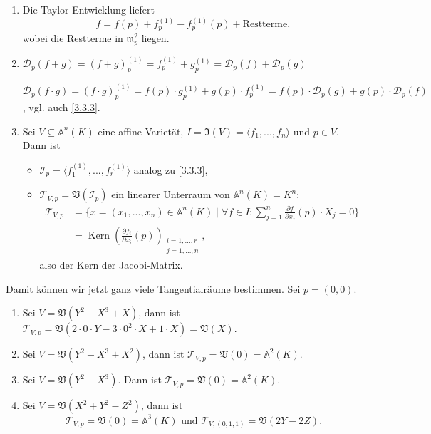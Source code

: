 \documentclass[a4paper,12pt]{scrbook}
\theoremstyle{keinenummern} %
\theoremstyle{mitnummern}
\theoremstyle{unserbeweis}
\def\A{\mathbb{A}}
\def\V{\mathfrak{V}}
\def\I{\mathfrak{I}}
\def\II{\mathcal{I}}
\newcommand{\DD}{\mathcal{D}} %
\def\T{\mathcal{T}}
\def\m{\mathfrak{m}}
\newcommand{\Kern}{\operatorname{Kern}}
\let\olddotsc\dotsc %
\renewcommand{\dotsc}{\ensuremath{\!...}}
\begin{document}
\begin{bem}\label{3.3.4}
\begin{enumerate}
\item{} Die Taylor-Entwicklung liefert
\[f=f(p)+f_{p}^{(1)}-f_{p}^{(1)}(p)+\text{Restterme},\]
wobei die Restterme in $\m_{p}^{2}$ liegen.
\item{} $\DD_{p}(f+g)=(f+g)_{p}^{(1)}=f_{p}^{(1)}+g_{p}^{(1)}=\DD_{p}(f)+\DD_{p}(g)$

$\DD_{p}(f\cdot g)=(f\cdot g)_{p}^{(1)}=f(p)\cdot g_{p}^{(1)}+g(p)\cdot f_{p}^{(1)}=f(p)\cdot \DD_{p}(g)+g(p)\cdot\DD_{p}(f)$, vgl. auch \cref{3.3.3}.
\item{} Sei $V\subseteq\A^{n}(K)$ eine affine Varietät, $I=\I(V)=\langle f_{1},\dotsc,f_{n}\rangle$ und $p\in V$. Dann ist
\begin{itemize}
\item $\II_{p}=\langle f_{1}^{(1)},\dotsc,f_{r}^{(1)}\rangle$ analog zu \cref{3.3.3},
\item $\T_{V,p}=\V(\II_{p})$ ein linearer Unterraum von $\A^{n}(K)=K^{n}$:
\begin{align*}\T_{V,p}&=\{x=(x_{1},\dotsc,x_{n})\in\A^{n}(K)\mid \forall f\in I:\sum_{j=1}^{n}\frac{\partial f}{\partial x_{j}}(p)\cdot X_{j}=0\}\\
&=\Kern\left(\frac{\partial f_{i}}{\partial x_{i}}(p)\right)_{\substack{i=1,\olddotsc,r\\ j=1,\olddotsc,n}},\end{align*}
also der Kern der Jacobi-Matrix.
\end{itemize}
\end{enumerate}\end{bem}

\begin{bsp}\label{3.3.5}
Damit können wir jetzt ganz viele Tangentialräume bestimmen. Sei $p=(0,0)$.
\begin{enumerate}
\item Sei $V=\V(Y^{2}-X^{3}+X)$, dann ist $\T_{V,p}=\V(2\cdot 0\cdot Y - 3\cdot 0^{2}\cdot X + 1\cdot X)=\V(X)$.
\item Sei $V=\V(Y^{2}-X^{3}+X^{2})$, dann ist $\T_{V,p}=\V(0)=\A^{2}(K)$.
\item Sei $V=\V(Y^{2}-X^{3})$. Dann ist $\T_{V,p}=\V(0)=\A^{2}(K)$.
\item Sei $V=\V(X^{2}+Y^{2}-Z^{2})$, dann ist 
\[\T_{V,p}=\V(0)=\A^{3}(K)\text{ und }\T_{V,(0,1,1)}=\V(2Y-2Z).\]
\end{enumerate}\end{bsp}
\end{document}
